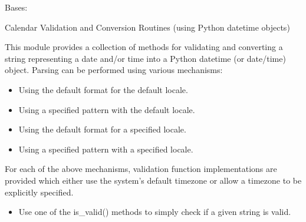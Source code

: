 \documentclass[letterpaper,10pt,english]{sphinxmanual}
\begin{document}
\begin{fulllineitems}
\label{\detokenize{apache_commons_validator_python.routines:apache_commons_validator_python.routines.calendar_validator.CalendarValidator}}
\pysigstartsignatures
{}
\pysigstopsignatures
\sphinxAtStartPar
Bases: 

\sphinxAtStartPar
Calendar Validation and Conversion Routines (using Python datetime objects)

\sphinxAtStartPar
This module provides a collection of methods for validating and converting a
string representing a date and/or time into a Python datetime (or date/time)
object. Parsing can be performed using various mechanisms:
\begin{itemize}
\item {} 
\sphinxAtStartPar
Using the default format for the default locale.

\item {} 
\sphinxAtStartPar
Using a specified pattern with the default locale.

\item {} 
\sphinxAtStartPar
Using the default format for a specified locale.

\item {} 
\sphinxAtStartPar
Using a specified pattern with a specified locale.

\end{itemize}

\sphinxAtStartPar
For each of the above mechanisms, validation function implementations are provided
which either use the system’s default timezone or allow a timezone to be explicitly specified.
\begin{description}
\begin{itemize}
\item {} 
\sphinxAtStartPar
Use one of the is\_valid() methods to simply check if a given string is valid.


\end{itemize}
\end{description}
\end{fulllineitems}
\end{document}
